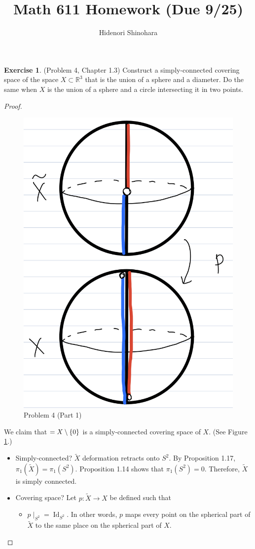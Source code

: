 \documentclass[12pt, psamsfonts]{amsart}
\theoremstyle{definition}
\newtheorem*{exer}{Exercise}
\theoremstyle{remark}
\DeclareMathOperator{\Id}{Id}
\numberwithin{equation}{section}
\begin{document}
\title{Math 611 Homework (Due 9/25)}
\author{Hidenori Shinohara}
\maketitle

\begin{exer}{(Problem 4, Chapter 1.3)}
  Construct a simply-connected covering space of the space $X \subset \mathbb{R}^3$ that is the union of a sphere and a diameter.
  Do the same when $X$ is the union of a sphere and a circle intersecting it in two points.
\end{exer}

\begin{proof}
  \begin{figure}
    \includegraphics[width=.5\linewidth]{problem4-1.jpeg}
    \caption{Problem 4 (Part 1)}
    \label{fig:prob4_1}
  \end{figure}
  We claim that $\title{X} = X \setminus \{ 0 \}$ is a simply-connected covering space of $X$.
  (See Figure \ref{fig:prob4_1}.)
  \begin{itemize}
    \item
      Simply-connected?
      $\tilde{X}$ deformation retracts onto $S^2$.
      By Proposition 1.17, $\pi_1(\tilde{X}) = \pi_1(S^2)$.
      Proposition 1.14 shows that $\pi_1(S^2) = 0$.
      Therefore, $\tilde{X}$ is simply connected.
    \item
      Covering space?
      Let $p: \tilde{X} \rightarrow X$ be defined such that
      \begin{itemize}
        \item
          $p\mid_{S^2} = \Id_{S^2}$.
          In other words, $p$ maps every point on the spherical part of $\tilde{X}$ to the same place on the spherical part of $X$.

\end{itemize}
\end{itemize}
\end{proof}
\end{document}
